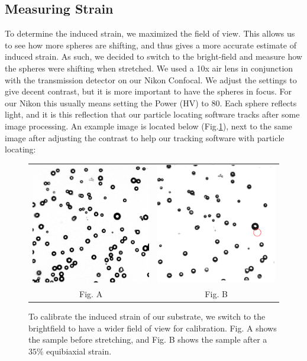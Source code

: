 \subsection{Measuring Strain}
To determine the induced strain, we maximized the field of view. This allows us to see how more spheres are shifting, and thus gives a more accurate estimate of induced strain. As such, we decided to switch to the bright-field and measure how the spheres were shifting when stretched. We used a 10x air lens in conjunction with the transmission detector on our Nikon Confocal. We adjust the settings to give decent contrast, but it is more important to have the spheres in focus. For our Nikon this usually means setting the Power (HV) to 80. Each sphere reflects light, and it is this reflection that our particle locating software tracks after some image processing. An example image is located below (Fig.\ref{fig:TDpreandpost}), next to the same image after adjusting the contrast to help our tracking software with particle locating: 

\begin{figure}[h!]
	\begin{tabular}{cc}
		\includegraphics[width= .48\linewidth,frame]{Chapters/Figures/181115_unstretched_b_thesis_contrast.png} & \includegraphics[width= .48\linewidth,frame]{Chapters/Figures/181115_stretched_thesis_contrast.png}\\
		Fig. A & Fig. B
	\end{tabular}
	\caption[Bright-field stretch calibration images]{To calibrate the induced strain of our substrate, we switch to the brightfield to have a wider field of view for calibration. Fig. A shows the sample before stretching, and Fig. B shows the sample after a $ 35\% $ equibiaxial strain.}
		\label{fig:TDpreandpost}
\end{figure}


